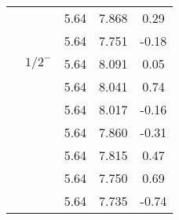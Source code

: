 \documentclass[prd,twocolumn,floatfix,nofootinbib]{revtex4}
\begin{document}
\begin{table*}[!htbp]
\begin{tabular}{ccccc}
            &               &5.64   &7.868 &0.29  \\
            &               &5.64   &7.751 &-0.18  \\
            &${1/2}^{-}$    &5.64   &8.091 &0.05  \\
            &               &5.64   &8.041 &0.74  \\
            &               &5.64   &8.017 &-0.16  \\
            &               &5.64   &7.860 &-0.31  \\
            &               &5.64   &7.815 &0.47  \\
            &               &5.64   &7.750 &0.69  \\
            &               &5.64   &7.735 &-0.74  \\
        \hline\hline
    \end{tabular}
\end{table*}
\end{document}
